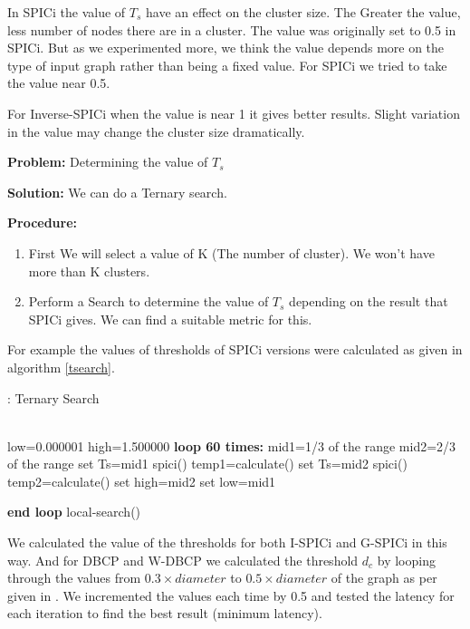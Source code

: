 \documentclass[10pt]{extarticle}
\begin{document}
	In SPICi the value of $T_s$ have an effect on the cluster size. The Greater the value, less number of nodes there are in a cluster. The value was originally set to 0.5 in SPICi.
	But as we experimented more, we think the value depends more on the type of input graph rather than being a fixed value. For SPICi we tried to take the value near 0.5.
	
	For Inverse-SPICi when the value is near 1 it gives better results. Slight variation in the value may change the cluster size dramatically. 
	
	\textbf{Problem:} Determining the value of $T_s$
	
	
	\textbf{Solution:} We can do a Ternary search.
	
	\textbf{Procedure:} 
	\begin{enumerate}
		\item First We will select a value of K (The number of cluster). We won't have more than K clusters.
		\item Perform a Search to determine the value of $T_s$ depending on the result that SPICi gives. We can find a suitable metric for this.
	\end{enumerate}
	For example the values of thresholds of SPICi versions were calculated as given in algorithm \ref{tsearch}.
	
	\begin{algorithm}
		\caption{: Ternary Search}\label{tsearch}
		\begin{algorithmic}[1]
			 \\
			low=0.000001
			high=1.500000
			\textbf{loop 60 times:}
			\State mid1=1/3 of the range
			\State mid2=2/3 of the range
			\State set Ts=mid1
			\State spici()
			\State temp1=calculate()
			\State set Ts=mid2
			\State spici()
			\State temp2=calculate()
			 set high=mid2
			\Else 
			\State set low=mid1
			\EndIf
			
			\textbf{end loop}
			local-search()        
			\EndProcedure
		\end{algorithmic}
	\end{algorithm} 
	We calculated the value of the thresholds for both I-SPICi and G-SPICi in this way. And for DBCP and W-DBCP we calculated the threshold $d_c$ by looping through the values from $0.3\times diameter$ to $0.5\times diameter$ of the graph as per given in \cite{dbcp}. We incremented the values each time by 0.5 and tested the latency for each iteration to find the best result (minimum latency).
	
\end{document}
